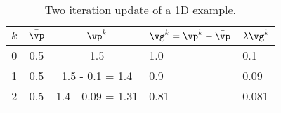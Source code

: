\documentclass[11pt, oneside]{article}   	%
\begin{document}
\begin{table}[htb]
  \caption{Two iteration update of a 1D example.}
  \label{tab:update_example} %
  \centering
  \begin{tabular}{c|c|c|l|l}
    $k$ & $\bar{\vp}$ & $\vp^k$ & $\vg^k = \vp^k - \bar{\vp}$ & $\lambda \vg^k$ \\
   \hline
   \hline
   0 & 0.5 & 1.5 & 1.0 & 0.1 \\
   1 & 0.5 & 1.5 - 0.1 = 1.4 & 0.9 & 0.09 \\
   2 & 0.5 & 1.4 - 0.09 = 1.31 & 0.81 & 0.081
  \end{tabular}
\end{table}


% 
%     
% 
% 
\end{document}
